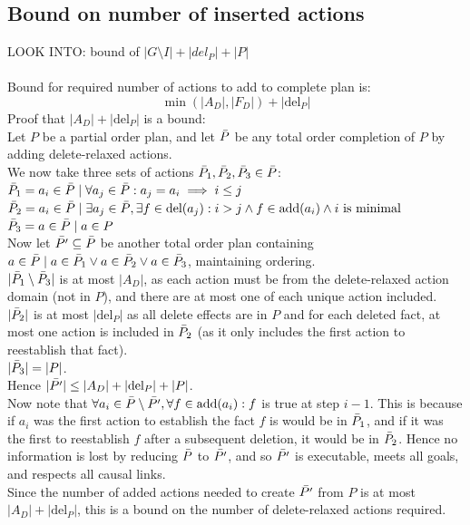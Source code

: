 \documentclass[runningheads]{llncs}
\begin{document}
\subsection{Bound on number of inserted actions}
LOOK INTO: bound of $|G\setminus I|+|del_P|+|P|$\\\\
Bound for required number of actions to add to complete plan is: \[\min (|A_D|,|F_D|)+ |\text{del}_P|\]
Proof that $|A_D|+ |\text{del}_P|$ is a bound:\\
Let $P$ be a partial order plan, and let $\Bar{P}$ be any total order completion of $P$ by adding delete-relaxed actions.\\
We now take three sets of actions $\Bar{P}_1,\Bar{P}_2,\Bar{P}_3\in\Bar{P}$:\\
$\Bar{P}_1=a_i\in\Bar{P}\mid \forall a_j\in\Bar{P}: a_j=a_i\implies i\leq j$\\
$\Bar{P}_2=a_i\in\Bar{P}\mid \exists a_j\in\Bar{P},\exists f\in \text{del}(a_j):i>j \wedge f\in \text{add}(a_i) \wedge i\text{ is minimal}$\\
$\Bar{P}_3=a\in\Bar{P}\mid a\in P$\\
Now let $\Bar{P'}\subseteq\Bar{P}$ be another total order plan containing $a\in \Bar{P}\mid a\in\Bar{P}_1\vee a\in\Bar{P}_2\vee a\in\Bar{P}_3$, maintaining ordering.\\
$|\Bar{P}_1\setminus \Bar{P}_3|$ is at most $|A_D|$, as each action must be from the delete-relaxed action domain (not in $P$), and there are at most one of each unique action included.\\
$|\Bar{P}_2|$ is at most $|\text{del}_P|$ as all delete effects are in $P$ and for each deleted fact, at most one action is included in $\Bar{P}_2$ (as it only includes the first action to reestablish that fact).\\
$|\Bar{P}_3|=|P|$.\\
Hence $|\Bar{P'}|\leq |A_D|+ |\text{del}_P| + |P|$.\\
Now note that $\forall a_i\in \Bar{P}\setminus\Bar{P'},\forall f\in \text{add}(a_i): f$ is true at step $i-1$. This is because if $a_i$ was the first action to establish the fact $f$ is would be in $\Bar{P}_1$, and if it was the first to reestablish $f$ after a subsequent deletion, it would be in $\Bar{P}_2$. Hence no information is lost by reducing $\Bar{P}$ to $\Bar{P'}$, and so $\Bar{P'}$ is executable, meets all goals, and respects all causal links.\\
Since the number of added actions needed to create $\Bar{P'}$ from $P$ is at most $|A_D|+ |\text{del}_P|$, this is a bound on the number of delete-relaxed actions required.
\end{document}
